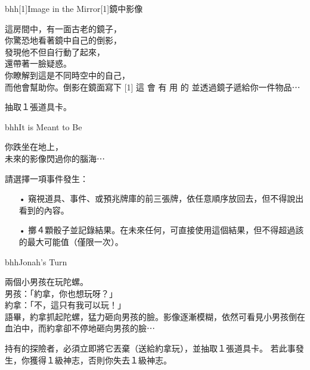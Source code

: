 \linebreak[0]%
\begin{EventCardSp}{bhh}{\scalebox{-1}[1]{Image in the Mirror}}{\scalebox{-1}[1]{鏡中影像}}
  \begin{CardStory}
    這房間中，有一面古老的鏡子，\\
    你驚恐地看著鏡中自己的倒影，\\
    發現他不但自行動了起來，\\
    還帶著一臉疑惑。\\
    你瞭解到這是不同時空中的自己，\\
    而他會幫助你。倒影在鏡面寫下\smallbreak
    \scalebox{-1}[1]{ \FontScript 這 \enskip 會 \enskip 有 \enskip 用 \enskip 的 }\smallbreak
    並透過鏡子遞給你一件物品⋯
\end{CardStory}
  抽取１張道具卡。\smallbreak
\end{EventCardSp}%
\linebreak[0]%
\begin{EventCard}{bhh}{It is Meant to Be}
  \begin{CardStory}
    你跌坐在地上，\\
    未來的影像閃過你的腦海⋯
  \end{CardStory}
  請選擇一項事件發生：
  \begin{itemize}
    \item[•] 窺視道具、事件、或預兆牌庫的前三張牌，依任意順序放回去，但不得說出看到的內容。
    \item[•] 擲４顆骰子並記錄結果。在未來任何\RollAny{}，可直接使用這個結果，但不得超過該\RollAny{}的最大可能值（僅限一次）。
  \end{itemize}
\end{EventCard}%
\linebreak[0]%
\begin{EventCard}{bhh}{Jonah’s Turn}
  \begin{CardStory}
    兩個小男孩在玩陀螺。\\
    男孩：「約拿，你也想玩呀？」\\
    約拿：「不，這只有我可以玩！」\\
    語畢，約拿抓起陀螺，猛力砸向男孩的臉。影像逐漸模糊，依然可看見小男孩倒在血泊中，而約拿卻不停地砸向男孩的臉⋯
\end{CardStory}
  持有的探險者，必須立即將它丟棄（送給約拿玩），並抽取１張道具卡。\smallbreak
  若此事發生，你獲得１級神志，否則你失去１級神志。\smallbreak
\end{EventCard}%
\linebreak[0]%
